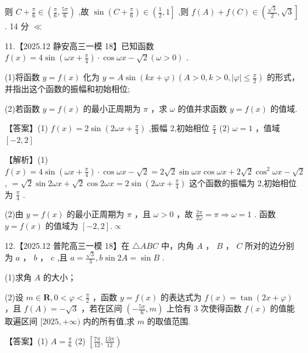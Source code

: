 \documentclass[10pt]{article}
\begin{document}
则 \(C + \frac{\pi }{6} \in  \left( {\frac{\pi }{6},\frac{5\pi }{6}}\right)\) ,故 \(\sin \left( {C + \frac{\pi }{6}}\right)  \in  \left( {\frac{1}{2},1}\right\rbrack\) ,则 \(f\left( A\right)  + f\left( C\right)  \in  \left( {\frac{\sqrt{3}}{2},\sqrt{3}}\right\rbrack\) . 14 分 \(\ll\)

11.【2025.12 静安高三一模 18】已知函数 \(f\left( x\right)  = 4\sin \left( {{\omega x} + \frac{\pi }{4}}\right)  \cdot  \cos {\omega x} - \sqrt{2}\left( {\omega  > 0}\right)\) .

(1)将函数 \(y = f\left( x\right)\) 化为 \(y = A\sin \left( {{kx} + \varphi }\right) \left( {A > 0,k > 0,\left| \varphi \right|  \leq  \frac{\pi }{2}}\right)\) 的形式，并指出这个函数的振幅和初始相位;

(2)若函数 \(y = f\left( x\right)\) 的最小正周期为 \(\pi\) ，求 \(\omega\) 的值并求函数 \(y = f\left( x\right)\) 的值域.

【答案】(1) \(f\left( x\right)  = 2\sin \left( {{2\omega x} + \frac{\pi }{4}}\right)\) ,振幅 2,初始相位 \(\frac{\pi }{4}\) (2) \(\omega  = 1\) ，值域 \(\left\lbrack  {-2,2}\right\rbrack\)

【解析】(1) \(f\left( x\right)  = 4\sin \left( {{\omega x} + \frac{\pi }{4}}\right)  \cdot  \cos {\omega x} - \sqrt{2} = 2\sqrt{2}\sin {\omega x}\cos {\omega x} + 2\sqrt{2}{\cos }^{2}{\omega x} - \sqrt{2}\) , \(= \sqrt{2}\sin {2\omega x} + \sqrt{2}\cos {2\omega x} = 2\sin \left( {{2\omega x} + \frac{\pi }{4}}\right)\) 这个函数的振幅为 2,初始相位为 \(\frac{\pi }{4}\) .

(2)由 \(y = f\left( x\right)\) 的最小正周期为 \(\pi\) ，且 \(\omega  > 0\) ，故 \(\frac{2\pi }{2\omega } = \pi  \Rightarrow  \omega  = 1\) . 函数 \(y = f\left( x\right)\) 的值域为 \(\left\lbrack  {-2,2}\right\rbrack  . \propto\)

12.【2025.12 普陀高三一模 18】在 \(\bigtriangleup  {ABC}\) 中，内角 \(A\) ， \(B\) ， \(C\) 所对的边分别为 \(a\) ， \(b\) ， \(c\) ,且 \(a = \frac{\sqrt{3}}{3},b\sin {2A} = \sin B\) .

(1)求角 \(A\) 的大小；

(2)设 \(m \in  \mathbf{R},0 < \varphi  < \frac{\pi }{2}\) ，函数 \(y = f\left( x\right)\) 的表达式为 \(f\left( x\right)  = \tan \left( {{2x} + \varphi }\right)\) ，且 \(f\left( A\right)  =  - \sqrt{3}\) ，若在区间 \(\left( {-\frac{5\pi }{6},m}\right)\) 上恰有 3 次使得函数 \(f\left( x\right)\) 的值能取遍区间 \(\lbrack {2025}, + \infty )\) 内的所有值,求 \(m\) 的取值范围.

【答案】(1) \(A = \frac{\pi }{6}\) (2) \(\left\lbrack  {\frac{7\pi }{12},\frac{13\pi }{12}}\right)\)
\end{document}
